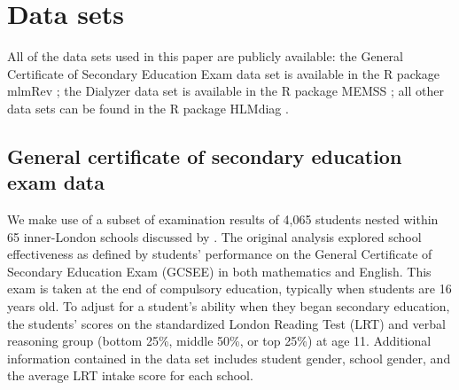 \documentclass[12pt]{article} %
\begin{document}
%
%

\clearpage




\clearpage
\appendix
\section{Data sets}\label{sec:datasets}

All of the data sets used in this paper are publicly available: the General Certificate of Secondary Education Exam data set is available in the R package mlmRev \citep{mlmRev}; the Dialyzer data set is available in the R package MEMSS \citep{MEMSS}; all other data sets can be found in the R package HLMdiag \citep{HLMDiag}.

\subsection{General certificate of secondary education exam data}\label{data:GCSE}

We make use of a subset of examination results of 4,065 students nested within 65 inner-London schools discussed by \cite{Goldstein:1993wm}. The original analysis explored school effectiveness as defined by students' performance on the General Certificate of Secondary Education Exam (GCSEE) in both mathematics and English. This exam is taken at the end of compulsory education, typically when students are 16 years old.  To adjust for a student's ability when they began secondary education, the students' scores on the standardized London Reading Test (LRT) and verbal reasoning group (bottom 25\%, middle 50\%, or top 25\%) at age 11. Additional information contained in the data set includes student gender, school gender, and the average LRT intake score for each school. 
\end{document}

